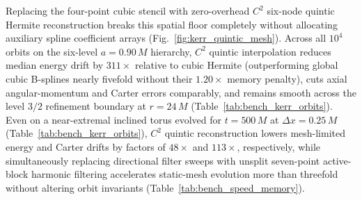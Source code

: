 Replacing the four-point cubic stencil with zero-overhead $C^2$ six-node quintic Hermite reconstruction breaks this spatial floor completely without allocating auxiliary spline coefficient arrays (Fig.~\ref{fig:kerr_quintic_mesh}). Across all $10^4$ orbits on the six-level $a = 0.90\,M$ hierarchy, $C^2$ quintic interpolation reduces median energy drift by $311\times$ relative to cubic Hermite (outperforming global cubic B-splines nearly fivefold without their $1.20\times$ memory penalty), cuts axial angular-momentum and Carter errors comparably, and remains smooth across the level $3/2$ refinement boundary at $r = 24\,M$ (Table~\ref{tab:bench_kerr_orbits}). Even on a near-extremal inclined torus evolved for $t = 500\,M$ at $\Delta x = 0.25\,M$ (Table~\ref{tab:bench_kerr_orbits}), $C^2$ quintic reconstruction lowers mesh-limited energy and Carter drifts by factors of $48\times$ and $113\times$, respectively, while simultaneously replacing directional filter sweeps with unsplit seven-point active-block harmonic filtering accelerates static-mesh evolution more than threefold without altering orbit invariants (Table~\ref{tab:bench_speed_memory}).
